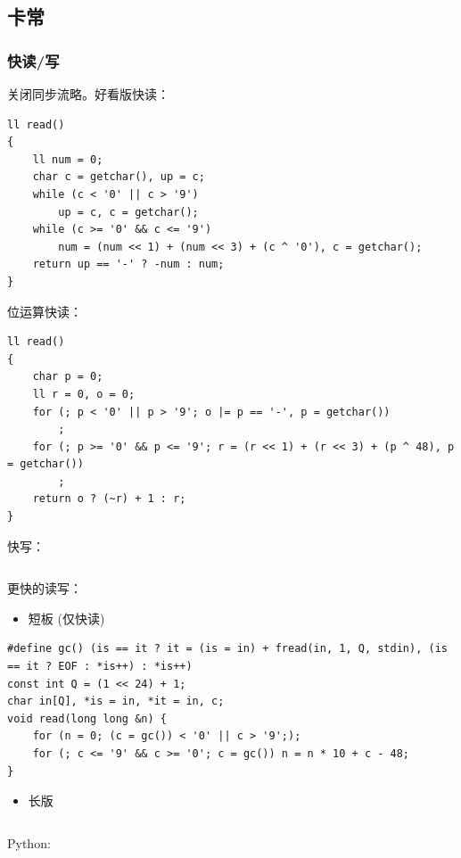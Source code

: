 \documentclass[twocolumn,10pt]{ctexart}
\begin{document}
\inputminted{cpp}{code/ext_081.cpp}

\subsection{卡常}

\subsubsection{快读/写}

关闭同步流略。好看版快读：

\begin{verbatim}
ll read()
{
    ll num = 0;
    char c = getchar(), up = c;
    while (c < '0' || c > '9')
        up = c, c = getchar();
    while (c >= '0' && c <= '9')
        num = (num << 1) + (num << 3) + (c ^ '0'), c = getchar();
    return up == '-' ? -num : num;
}
\end{verbatim}

位运算快读：

\begin{verbatim}
ll read()
{
    char p = 0;
    ll r = 0, o = 0;
    for (; p < '0' || p > '9'; o |= p == '-', p = getchar())
        ;
    for (; p >= '0' && p <= '9'; r = (r << 1) + (r << 3) + (p ^ 48), p = getchar())
        ;
    return o ? (~r) + 1 : r;
}
\end{verbatim}

快写：

\inputminted{cpp}{code/ext_082.cpp}

更快的读写：

\begin{itemize}
\item 短板 (仅快读)
\end{itemize}

\begin{verbatim}
#define gc() (is == it ? it = (is = in) + fread(in, 1, Q, stdin), (is == it ? EOF : *is++) : *is++)
const int Q = (1 << 24) + 1;
char in[Q], *is = in, *it = in, c;
void read(long long &n) {
    for (n = 0; (c = gc()) < '0' || c > '9';);
    for (; c <= '9' && c >= '0'; c = gc()) n = n * 10 + c - 48;
}
\end{verbatim}

\begin{itemize}
\item 长版
\end{itemize}

\inputminted{cpp}{code/fastio.cpp}

Python:
\end{document}
